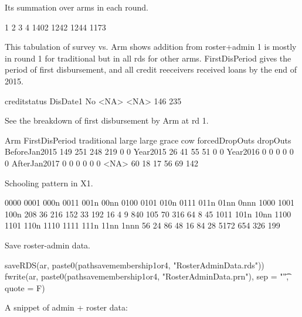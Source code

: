 Its summation over arms in each round.
\begin{Schunk}
\begin{Soutput}
   1    2    3    4 
1402 1242 1244 1173 
\end{Soutput}
\end{Schunk}
This tabulation of \textsf{survey} vs. \textsf{Arm} shows addition from \textsf{roster+admin} 1 is mostly in round 1 for \textsf{traditional} but in all rds for other arms. \textsf{FirstDisPeriod} gives the period of first disbursement, and all credit reeceivers received loans by the end of 2015.
\begin{Schunk}
\begin{Soutput}
        creditstatus
DisDate1  No <NA>
    <NA> 146  235
\end{Soutput}
\end{Schunk}
See the breakdown of first disbursement by Arm at rd 1.
\begin{Schunk}
\begin{Soutput}
               Arm
FirstDisPeriod  traditional large large grace cow forcedDropOuts dropOuts
  BeforeJan2015         149   251         248 219              0        0
  Year2015               26    41          55  51              0        0
  Year2016                0     0           0   0              0        0
  AfterJan2017            0     0           0   0              0        0
  <NA>                   60    18          17  56             69      142
\end{Soutput}
\end{Schunk}
Schooling pattern in X1.
\begin{Schunk}
\begin{Soutput}

0000 0001 000n 0011 001n 00nn 0100 0101 010n 0111 011n 01nn 0nnn 1000 1001 100n 
 208   36  216  152   33  192   16    4    9  840  105   70  316   64    8   45 
1011 101n 10nn 1100 1101 110n 1110 1111 111n 11nn 1nnn 
  56   24   86   48   16   84   28 5172  654  326  199 
\end{Soutput}
\end{Schunk}
Save roster-admin data.
\begin{Schunk}
\begin{Sinput}
saveRDS(ar, paste0(pathsavemembership1or4, "RosterAdminData.rds"))
fwrite(ar, paste0(pathsavemembership1or4, "RosterAdminData.prn"), sep = "\t", quote = F)
\end{Sinput}
\end{Schunk}
A snippet of \textsf{admin + roster} data:
